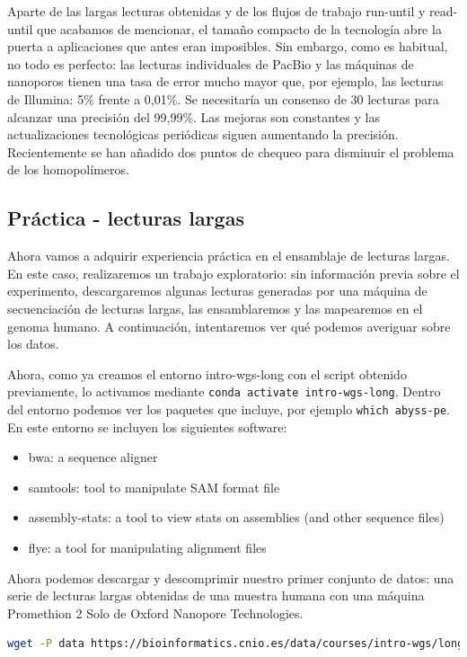 Aparte de las largas lecturas obtenidas y de los flujos de trabajo run-until y read-until que acabamos de mencionar, el tamaño compacto de la tecnología abre la puerta a aplicaciones que antes eran imposibles.
Sin embargo, como es habitual, no todo es perfecto: las lecturas individuales de PacBio y las máquinas de nanoporos tienen una tasa de error mucho mayor que, por ejemplo, las lecturas de Illumina: 5\% frente a 0,01\%. Se necesitaría un consenso de 30 lecturas para alcanzar una precisión del 99,99\%.
Las mejoras son constantes y las actualizaciones tecnológicas periódicas siguen aumentando la precisión. Recientemente se han añadido dos puntos de chequeo para disminuir el problema de los homopolímeros.

\subsection{Práctica - lecturas largas}
Ahora vamos a adquirir experiencia práctica en el ensamblaje de lecturas largas.
En este caso, realizaremos un trabajo exploratorio: sin información previa sobre el experimento, descargaremos algunas lecturas generadas por una máquina de secuenciación de lecturas largas, las ensamblaremos y las mapearemos en el genoma humano. A continuación, intentaremos ver qué podemos averiguar sobre los datos.

Ahora, como ya creamos el entorno intro-wgs-long con el script obtenido previamente, lo activamos mediante \texttt{conda activate intro-wgs-long}. Dentro del entorno podemos ver los paquetes que incluye, por ejemplo \texttt{which abyss-pe}. En este entorno se incluyen los siguientes software:
\begin{itemize}
\item bwa: a sequence aligner
\item samtools: tool to manipulate SAM format file
\item assembly-stats: a tool to view stats on assemblies (and other sequence files)
\item flye: a tool for manipulating alignment files
\end{itemize}

Ahora podemos descargar y descomprimir nuestro primer conjunto de datos: una serie de lecturas largas obtenidas de una muestra humana con una máquina Promethion 2 Solo de Oxford Nanopore Technologies.
\begin{lstlisting}[language=bash]
wget -P data https://bioinformatics.cnio.es/data/courses/intro-wgs/long_reads.fastq.gz
\end{lstlisting}

